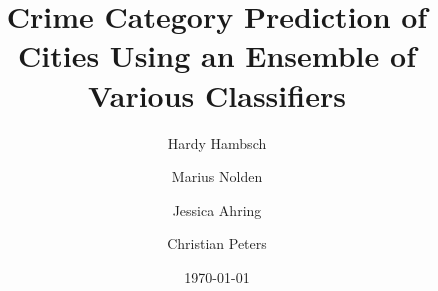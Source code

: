 \ifluatex

\usepackage{fontspec}


\else

\usepackage[utf8]{inputenc}

\usepackage[T1]{fontenc}
\fi

\usepackage[english]{babel}

\usepackage{graphicx}
\usepackage{color}
\usepackage{float}

\usepackage[english]{fancyref}


\usepackage{setspace}

\usepackage[backend=biber,
autolang=hyphen,
style=alphabetic,
citestyle=alphabetic,
giveninits=false
]{biblatex}

\title{Crime Category Prediction of Cities Using an Ensemble of Various Classifiers}
\author {
	Hardy Hambsch
	\and
	Marius Nolden
	\and
	Jessica Ahring
	\and
	Christian Peters
}
\date{\today}
